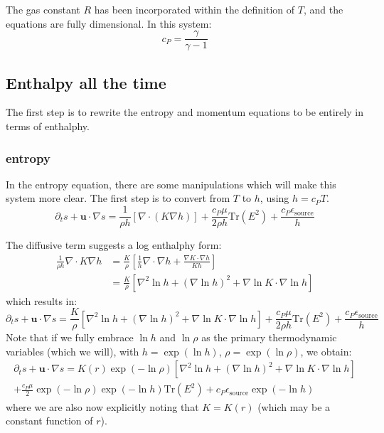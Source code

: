 \documentclass{aastex62}
\newcommand{\del}{\nabla}
\renewcommand{\vec}{\boldsymbol}
\begin{document}
The gas constant $R$ has been incorporated within the definition of $T$, and the equations are fully dimensional.  In this system:
\begin{equation}
  c_P = \frac{\gamma}{\gamma - 1}
\end{equation}



\subsection{Enthalpy all the time}
The first step is to rewrite the entropy and momentum equations to be entirely in terms of enthalphy.

\subsubsection{entropy}
In the entropy equation, there are some manipulations which will make this system more clear.  The first step is to convert from $T$ to $h$, using $h = c_P T$.
\begin{equation}
  \partial_t s + \vec{u}\cdot \del s = \frac{1}{\rho h}\left[\del \cdot (K \del h)\right] + \frac{c_P \mu}{2 \rho h}\mathrm{Tr}(E^2) + \frac{c_P \epsilon_\mathrm{source}}{h}
\end{equation}

The diffusive term suggests a log enthalphy form:
\begin{align}
  \frac{1}{\rho h}\del\cdot K \del h &= \frac{K}{\rho}\left[\frac{1}{h}\del\cdot\del h + \frac{\del K \cdot \del h}{K h} \right] \\
  & = \frac{K}{\rho}\left[\nabla^2 \ln h + \left(\nabla \ln h\right)^2 + \del \ln K \cdot \del \ln h \right]
\end{align}
which results in:
\begin{equation}
  \partial_t s + \vec{u}\cdot \del s = \frac{K}{\rho}\left[\nabla^2 \ln h + \left(\nabla \ln h\right)^2 + \del \ln K \cdot \del \ln h \right] + \frac{c_P \mu}{2 \rho h}\mathrm{Tr}(E^2) + \frac{c_P \epsilon_\mathrm{source}}{h}
\end{equation}
Note that if we fully embrace $\ln h$ and $\ln \rho$ as the primary thermodynamic variables (which we will), with $h = \exp(\ln h)$, $\rho = \exp(\ln \rho)$, we obtain:
\begin{multline}
  \partial_t s + \vec{u}\cdot \del s = K(r) \exp(-\ln \rho)\left[\nabla^2 \ln h + \left(\nabla \ln h\right)^2 + \del \ln K \cdot \del \ln h \right] \\ + \frac{c_P \mu}{2} \exp(-\ln \rho) \exp(-\ln h)\mathrm{Tr}(E^2) + c_P \epsilon_\mathrm{source} \exp(-\ln h)
\end{multline}
where we are also now explicitly noting that $K=K(r)$ (which may be a constant function of $r$).
\end{document}
